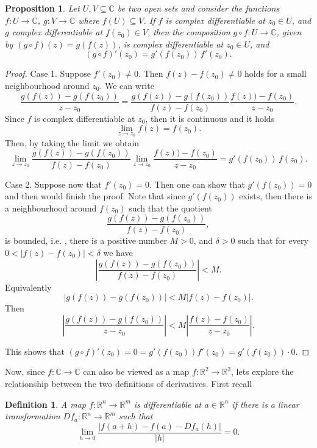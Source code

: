 \documentclass{amsart}
\newtheorem{prop}{Proposition}
\newtheorem{mydef}{Definition}
\begin{document}
\begin{prop}
Let \(U,V \subseteq \mathbb{C}\) be two open sets and consider the functions  \(f:U\to \mathbb{C}\), \(g:V \to \mathbb{C}\) where \(f(U)\subseteq V\). If \(f\) is complex differentiable at \(z_0\in U\), and
\(g\) complex differentiable at \(f(z_0)\in V\), then the composition \(g\circ f : U \to \mathbb{C}\), given by \((g\circ f)(z) = g(f(z))\), is complex differentiable at \(z_0\in U\), and
\[ (g\circ f)'(z_0) = g'(f(z_0))\, f'(z_0). \]
\end{prop}
\begin{proof}
Case 1. Suppose \(f'(z_0) \neq 0\). Then \(f(z) - f(z_0) \neq 0\) holds for a small neighbourhood around \(z_0\). We can write
\[ \frac{g(f(z)) - g(f(z_0))}{z - z_0} = \frac{g(f(z)) - g(f(z_0))}{f(z) - f(z_0)} \frac{f(z)) - f(z_0)}{z - z_0}.\]
Since \(f\) is complex differentiable at \(z_0\),  then it is continuous and it holds
\[ \lim_{z\to z_0} f(z) = f(z_0). \]
Then, by taking the limit we obtain
\[ \lim_{z\to z_0} \frac{g(f(z)) - g(f(z_0))}{f(z) - f(z_0)}  \lim_{z\to z_0}\frac{f(z)) - f(z_0)}{z - z_0} = g'(f(z_0)) \, f(z_0). \]

Case 2. Suppose now that \(f'(z_0) = 0\). Then one can show that \(g'(f(z_0)) = 0\) and then would finish the proof. Note that since \(g'(f(z_0))\) exists, then there is a neighbourhood around
\(f(z_0)\) such that the quotient
\[ \frac{g(f(z)) - g(f(z_0))}{f(z) - f(z_0)} ,\]
is bounded, i.e. , there is a positive number \(M>0\), and \(\delta >0\) such that for every \(0 < | f(z) - f(z_0) |< \delta\) we have
\[ \left| \frac{g(f(z)) - g(f(z_0))}{f(z) - f(z_0)}\right| < M .\]
Equivalently
\[  |g(f(z)) - g(f(z_0))| < M | {f(z) - f(z_0)} | .\]
Then
\[ \left| \frac{g(f(z)) - g(f(z_0))}{z - z_0}\right| < M \left| \frac{f(z) - f(z_0)}{z - z_0} \right|.\]

This shows that \((g\circ f)'(z_0) = 0 = g'(f(z_0)) f'(z_0) = g'(f(z_0)) \cdot 0\).
\end{proof}


Now, since \(f:\mathbb{C}\to \mathbb{C}\) can also be viewed as a map \(f: \mathbb{R}^2 \to \mathbb{R}^2\), lets explore the relationship between the two definitions of derivatives.
First recall
\begin{mydef}
A map \(f:\mathbb{R}^n \to \mathbb{R}^m\) is differentiable at \(a\in \mathbb{R}^n\) if there is a linear transformation \(Df_a: \mathbb{R}^n \to \mathbb{R}^m\) such that
\[ \lim_{h\to 0} \frac{|f(a + h) - f(a) - Df_a(h)|}{|h|} = 0. \]
\end{mydef}
\end{document}
